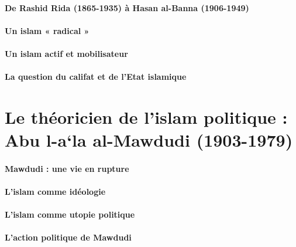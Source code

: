 \paragraph{De Rashid Rida (1865-1935) à Hasan al-Banna (1906-1949)}
\paragraph{ Un islam « radical »}
\paragraph{Un islam actif et mobilisateur}
\paragraph{La question du califat et de l'Etat islamique}

    


   



    



    



  \section{{Le théoricien de l'islam
  politique} : {Abu l-a`la al-Mawdudi
  (1903-1979)}}

\paragraph{ Mawdudi : une vie en rupture}
\paragraph{L'islam comme idéologie}
\paragraph{L'islam comme utopie politique}
\paragraph{L'action politique de Mawdudi}

   



    



    



    


